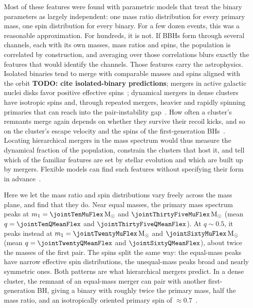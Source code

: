 \documentclass[%
 reprint,
 amsmath,amssymb,
 aps,
 prl,
 nofootinbib,nobibnotes,
 floatfix,
]{revtex4-2}
\newcommand{\Msun}{\ensuremath{\mathrm{M}_{\odot}}}
\newcommand{\todo}[1]{{\color{Blue}\bf TODO: #1}}
\begin{document}
Most of these features were found with parametric models that treat the binary parameters as largely independent: one mass ratio distribution for every primary mass, one spin distribution for every binary. For a few dozen events, this was a reasonable approximation. For hundreds, it is not. If \acp{BBH} form through several channels, each with its own masses, mass ratios and spins, the population is correlated by construction, and averaging over those correlations blurs exactly the features that would identify the channels. Those features carry the astrophysics. Isolated binaries tend to merge with comparable masses and spins aligned with the orbit \todo{cite isolated-binary predictions}; mergers in active galactic nuclei disks favor positive effective spins~\cite{Li:2025iux}; dynamical mergers in dense clusters have isotropic spins and, through repeated mergers, heavier and rapidly spinning primaries that can reach into the pair-instability gap~\cite{Fishbach:2017dwv, Gerosa:2017kvu, Rodriguez:2019huv, Gerosa:2021mno, Antonini:2025ilj}. How often a cluster's remnants merge again depends on whether they survive their recoil kicks, and so on the cluster's escape velocity and the spins of the first-generation \acp{BH}~\cite{Gerosa:2021mno}. Locating hierarchical mergers in the mass spectrum would thus measure the dynamical fraction of the population, constrain the clusters that host it, and tell which of the familiar features are set by stellar evolution and which are built up by mergers. Flexible models can find such features without specifying their form in advance~\cite{Edelman:2022ydv, Callister:2023tgi, Ray:2023upk, Heinzel:2024jlc, Alvarez-Lopez:2025ltt}.

Here we let the mass ratio and spin distributions vary freely across the mass plane, and find that they do. Near equal masses, the primary mass spectrum peaks at $m_1 = \jointTenMuFlex\,\Msun$ and $\jointThirtyFiveMuFlex\,\Msun$ (mean $q = \jointTenQMeanFlex$ and $\jointThirtyFiveQMeanFlex$). At $q \sim 0.5$, it peaks instead at $m_1 = \jointTwentyMuFlex\,\Msun$ and $\jointSixtyMuFlex\,\Msun$ (mean $q = \jointTwentyQMeanFlex$ and $\jointSixtyQMeanFlex$), about twice the masses of the first pair. The spins split the same way: the equal-mass peaks have narrow effective spin distributions, the unequal-mass peaks broad and nearly symmetric ones. Both patterns are what hierarchical mergers predict. In a dense cluster, the remnant of an equal-mass merger can pair with another first-generation \ac{BH}, giving a binary with roughly twice the primary mass, half the mass ratio, and an isotropically oriented primary spin of $\approx 0.7$~\cite{Fishbach:2017dwv, Gerosa:2017kvu, Rodriguez:2019huv, Gerosa:2021mno}.
\end{document}
